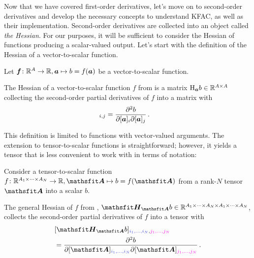 Now that we have covered first-order derivatives, let's move on to second-order derivatives and develop the necessary concepts to understand KFAC, as well as their implementation.
Second-order derivatives are collected into an object called \emph{the Hessian}.
For our purposes, it will be sufficient to consider the Hessian of functions producing a scalar-valued output.
Let's start with the definition of the Hessian of a vector-to-scalar function.

\begin{setup}\label{setup:vector_to_scalar_function}
  Let ${\bm{f}}\colon {\mathbb{R}}^A \to {\mathbb{R}}, {\bm{a}} \mapsto b = f({\bm{a}})$ be a vector-to-scalar function.
\end{setup}

\begin{definition}\label{def:vector_hessian}
  The Hessian of a vector-to-scalar function $f$ from  is a matrix $\mathrm{H}_{{\bm{a}}}b \in {\mathbb{R}}^{A \times A}$ collecting the second-order partial derivatives of $f$ into a matrix with
  \begin{align*}
    [\hess_{\va}b]_{i,j}
     & =
    \frac{\partial^2 b}{\partial [\va]_i \partial [\va]_j}\,.
  \end{align*}
\end{definition}
This definition is limited to functions with vector-valued arguments. The extension to tensor-to-scalar functions is straightforward; however, it yields a tensor that is less convenient to work with in terms of notation:

\begin{setup}\label{setup:hessians}
  Consider a tensor-to-scalar function $f\colon \sR^{A_1 \times \dots \times A_N} \to \sR, \tA \mapsto b = f(\tA)$ from a rank-$N$ tensor $\tA$ into a scalar $b$.
\end{setup}

\begin{definition}\label{def:general_hessian}
  The general Hessian of $f$ from , $\tH_{\tA}b \in \sR^{A_1 \times \dots \times A_N \times A_1 \times \dots \times A_N}$, collects the second-order partial derivatives of $f$ into a tensor with
  \begin{align*}
     & [\tH_{\tA}b]_{\colored{i_1, \dots, i_N}, \colored[VectorPink]{j_1, \dots, j_N}}
    \\
     & =
    \frac{\partial^2 b}{\partial [\tA]_{\colored{i_1, \dots, i_N}} \partial [\tA]_{\colored[VectorPink]{j_1, \dots, j_N}}}\,.
  \end{align*}
\end{definition}

